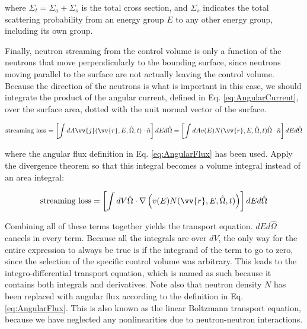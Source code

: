 \documentclass[10pt]{article}
\begin{document}
\begin{flushleft}
where \(\Sigma_t=\Sigma_a+\Sigma_s\) is the total cross section, and \(\Sigma_s\) indicates the total scattering probability from an energy group \(E\) to any other energy group, including its own group. 

Finally, neutron streaming from the control volume is only a function of the neutrons that move perpendicularly to the bounding surface, since neutrons moving parallel to the surface are not actually leaving the control volume. Because the direction of the neutrons is what is important in this case, we should integrate the product of the angular current, defined in Eq. \eqref{eq:AngularCurrent}, over the surface area, dotted with the unit normal vector of the surface. 

\begin{equation}
\label{eq:ConservationStreaming1}
\textrm{streaming loss} = \left\lbrack\int dA \vv{j}(\vv{r}, E, \hat{\Omega},t)\cdot \hat{n}\right\rbrack dEd\hat{\Omega}=\left\lbrack\int dA v(E)N(\vv{r}, E, \hat{\Omega},t)\hat{\Omega}\cdot \hat{n}\right\rbrack dEd\hat{\Omega}
\end{equation}

where the angular flux definition in Eq. \eqref{eq:AngularFlux} has been used. Apply the divergence theorem so that this integral becomes a volume integral instead of an area integral:

\begin{equation}
\label{eq:ConservationStreaming2}
\textrm{streaming loss} =\left\lbrack\int dV \hat{\Omega}\cdot\nabla\left(v(E)N(\vv{r}, E, \hat{\Omega},t)\right)\right\rbrack dEd\hat{\Omega}
\end{equation}

Combining all of these terms together yields the transport equation. \(dEd\hat{\Omega}\) cancels in every term. Because all the integrals are over \(dV\), the only way for the entire expression to always be true is if the integrand of the term to go to zero, since the selection of the specific control volume was arbitrary. This leads to the integro-differential transport equation, which is named as such because it contains both integrals and derivatives. Note also that neutron density \(N\) has been replaced with angular flux according to the definition in Eq. \eqref{eq:AngularFlux}. This is also known as the linear Boltzmann transport equation, because we have neglected any nonlinearities due to neutron-neutron interactions. 


\end{flushleft}
\end{document}
